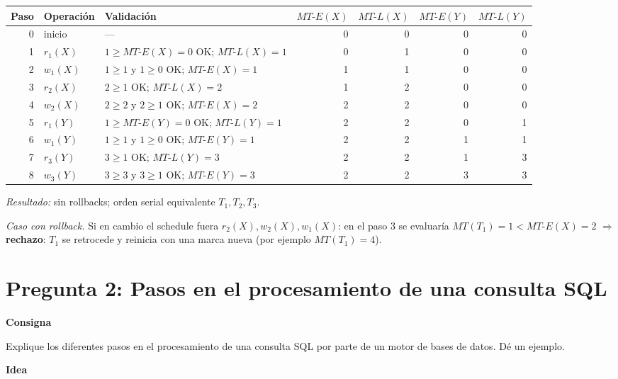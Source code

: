 \documentclass[11pt,a4paper]{article}
\newcommand{\itemcabecera}[1]{\noindent\textbf{#1}\par\medskip}
\newcommand{\bloqueConsigna}{\itemcabecera{Consigna}}
\newcommand{\bloqueIdea}{\itemcabecera{Idea}}
\begin{document}
\begin{center}
\small
\begin{tabular}{r l l rrrr}
\toprule
Paso & Operación & Validación & $MT\text{-}E(X)$ & $MT\text{-}L(X)$ & $MT\text{-}E(Y)$ & $MT\text{-}L(Y)$ \\
\midrule
0 & inicio    & ---                                            & 0 & 0 & 0 & 0 \\
1 & $r_1(X)$  & $1 \ge MT\text{-}E(X)=0$ OK; $MT\text{-}L(X)=1$ & 0 & 1 & 0 & 0 \\
2 & $w_1(X)$  & $1 \ge 1$ y $1 \ge 0$ OK; $MT\text{-}E(X)=1$    & 1 & 1 & 0 & 0 \\
3 & $r_2(X)$  & $2 \ge 1$ OK; $MT\text{-}L(X)=2$                & 1 & 2 & 0 & 0 \\
4 & $w_2(X)$  & $2 \ge 2$ y $2 \ge 1$ OK; $MT\text{-}E(X)=2$    & 2 & 2 & 0 & 0 \\
5 & $r_1(Y)$  & $1 \ge MT\text{-}E(Y)=0$ OK; $MT\text{-}L(Y)=1$ & 2 & 2 & 0 & 1 \\
6 & $w_1(Y)$  & $1 \ge 1$ y $1 \ge 0$ OK; $MT\text{-}E(Y)=1$    & 2 & 2 & 1 & 1 \\
7 & $r_3(Y)$  & $3 \ge 1$ OK; $MT\text{-}L(Y)=3$                & 2 & 2 & 1 & 3 \\
8 & $w_3(Y)$  & $3 \ge 3$ y $3 \ge 1$ OK; $MT\text{-}E(Y)=3$    & 2 & 2 & 3 & 3 \\
\bottomrule
\end{tabular}
\end{center}

\textit{Resultado:} sin rollbacks; orden serial equivalente $T_1, T_2, T_3$.

\textit{Caso con rollback.} Si en cambio el schedule fuera $r_2(X), w_2(X), w_1(X)$: en el paso 3 se evaluaría $MT(T_1) = 1 < MT\text{-}E(X) = 2$ $\Rightarrow$ \textbf{rechazo}: $T_1$ se retrocede y reinicia con una marca nueva (por ejemplo $MT(T_1) = 4$).

\section{Pregunta 2: Pasos en el procesamiento de una consulta SQL}

\bloqueConsigna

Explique los diferentes pasos en el procesamiento de una consulta SQL por parte de un motor de bases de datos. Dé un ejemplo.

\bloqueIdea
\end{document}
